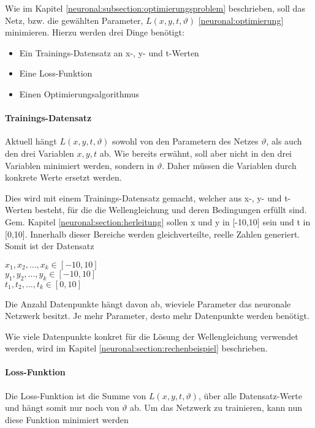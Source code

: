 Wie im Kapitel \ref{neuronal:subsection:optimierungsproblem} beschrieben, soll das Netz, bzw. die gewählten Parameter, \( L(x, y, t, \vartheta) \) \eqref{neuronal:optimierung} minimieren.
Hierzu werden drei Dinge benötigt:
\begin{itemize}
    \item Ein Trainings-Datensatz an x-, y- und t-Werten
    \item Eine Loss-Funktion
    \item Einen Optimierungsalgorithmus
\end{itemize}

\paragraph{Trainings-Datensatz}

Aktuell hängt \( L(x, y, t, \vartheta) \) sowohl von den Parametern des Netzes \( \vartheta \), als auch den drei Variablen \( x, y, t \) ab.
Wie bereits erwähnt, soll aber nicht in den drei Variablen minimiert werden, sondern in \( \vartheta \).
Daher müssen die Variablen durch konkrete Werte ersetzt werden.

Dies wird mit einem Trainings-Datensatz gemacht, welcher aus x-, y- und t-Werten besteht, für die die Wellengleichung und deren Bedingungen erfüllt sind.
Gem. Kapitel \ref{neuronal:section:herleitung} sollen x und y in [-10,10] sein und t in [0,10].
Innerhalb dieser Bereiche werden gleichverteilte, reelle Zahlen generiert.
Somit ist der Datensatz
\begin{center}
    \( x_1, x_2, \ldots, x_k \in [-10,10] \)\\
    \( y_1, y_2, \ldots, y_k \in [-10,10] \)\\
    \( t_1, t_2, \ldots, t_k \in [0,10] \)\\
\end{center}

Die Anzahl Datenpunkte hängt davon ab, wieviele Parameter das neuronale Netzwerk besitzt.
Je mehr Parameter, desto mehr Datenpunkte werden benötigt.

Wie viele Datenpunkte konkret für die Lösung der Wellengleichung verwendet werden, wird im Kapitel \ref{neuronal:section:rechenbeispiel} beschrieben.

\paragraph{Loss-Funktion}

Die Loss-Funktion ist die Summe von \( L(x, y, t, \vartheta) \), über alle Datensatz-Werte und hängt somit nur noch von \( \vartheta \) ab.
Um das Netzwerk zu trainieren, kann nun diese Funktion minimiert werden

